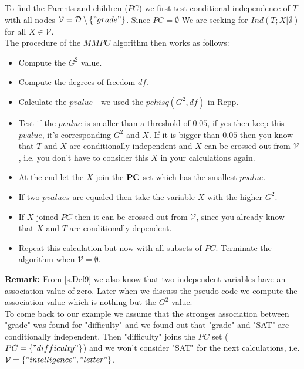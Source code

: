 			 \label{img.gradeSelected}

			To find the Parents and children ($PC$) we first test conditional independence of $T$ with all nodes $\mathcal{V} = \mathcal{D} \setminus \{"grade"\}$. Since $PC = \emptyset$ We are seeking for $Ind(T; X | \emptyset)$ for all $X \in \mathcal{V}$.\\
			The procedure of the $MMPC$ algorithm then works as follows:

			\begin{itemize}
				\item Compute the $G^{2}$ value.%
				\item Compute the degrees of freedom $df$.
				\item Calculate the $pvalue$ - we used the $pchisq(G^{2}, df)$ in Rcpp.
				\item Test if the $pvalue$ is smaller than a threshold of $0.05$, if yes then keep this $pvalue$, it's corresponding $G^{2}$ and $X$. If it is bigger than $0.05$ then you know that $T$ and $X$ are conditionally independent and $X$ can be crossed out from $\mathcal{V}$, i.e. you don't have to consider this $X$ in your calculations again.
				\item At the end let the $X$ join the ${\textbf{PC}}$ set which has the smallest $pvalue$.
				\item If two $pvalues$ are equaled then take the variable $X$ with the higher $G^{2}$.
				\item If $X$ joined $PC$ then it can be crossed out from $\mathcal{V}$, since you already know that $X$ and $T$ are conditionally dependent.
				\item Repeat this calculation but now with all subsets of $PC$. Terminate the algorithm when $\mathcal{V} = \emptyset$.
			\end{itemize}

			\textbf{Remark:} From \autoref{s.Def9} we also know that two independent variables have an association value of zero. Later when we discuss the pseudo code we compute the association value which is nothing but the $G^{2}$ value. \\

			To come back to our example we assume that the stronges association between "grade" was found for "difficulty" and we found out that "grade" and "SAT" are conditionally independent. Then "difficulty" joins the $PC$ set ($PC = \{"difficulty"\}$) and we won't consider "SAT" for the next calculations, i.e. $\mathcal{V} = \{ "intelligence", "letter" \}$.

